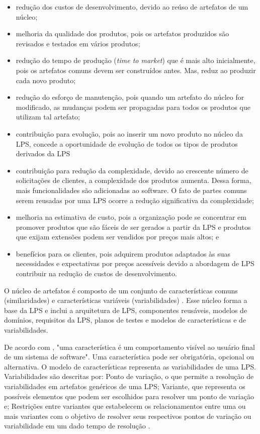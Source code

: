 \begin{itemize}
	\item redução dos custos de desenvolvimento, devido ao reúso de artefatos de um núcleo;
	\item melhoria da qualidade dos produtos, pois os artefatos produzidos são revisados e testados em vários produtos;
	\item redução do tempo de produção (\textit{time to market}) que é mais alto inicialmente, pois os artefatos comuns devem ser construídos antes. Mas, reduz ao produzir cada novo produto;
	\item redução do esforço de manutenção, pois quando um artefato do núcleo for modificado, as mudanças podem ser propagadas para todos os produtos que utilizam tal artefato;
	\item  contribuição para evolução, pois ao inserir um novo produto no núcleo da LPS, concede a oportunidade de evolução de todos os tipos de produtos derivados da LPS
	\item  contribuição para redução da complexidade, devido ao crescente número de solicitações de clientes, a complexidade dos produtos aumenta. Dessa forma, mais funcionalidades são adicionadas ao software. O fato de partes comuns serem 	reusadas por uma LPS ocorre a redução significativa da complexidade;
	\item melhoria na estimativa de custo, pois a organização pode se concentrar em promover produtos que são fáceis de ser gerados a partir da LPS e produtos que exijam extensões podem ser vendidos por preços mais altos; e 
	\item benefícios para os clientes, pois adquirem produtos adaptados às suas necessidades e expectativas por preços acessíveis devido a abordagem de LPS contribuir na redução de custos de desenvolvimento.
\end{itemize}

O núcleo de artefatos é composto de um conjunto de características comuns (similaridades) e características variáveis (variabilidades) \cite{linden2007product}. Esse núcleo forma a base da LPS e inclui a arquitetura de LPS, componentes reusáveis, modelos de domínios, requisitos da LPS, planos de testes e modelos de características e de variabilidades.

De acordo com \cite{apel2016feature}, "uma característica  é um comportamento visível ao usuário final de um sistema de software". Uma característica pode ser obrigatória, opcional ou alternativa. O modelo de características representa as variabilidades de uma LPS. Variabilidades são descritas por: Ponto de variação, o que permite a resolução de variabilidades em artefatos genéricos de uma LPS; Variante, que representa os possíveis elementos que podem ser escolhidos para resolver um ponto de variação e; Restrições entre variantes que estabelecem os relacionamentos entre uma ou mais variantes com o objetivo de resolver seus respectivos pontos de variação ou variabilidade em um dado tempo de resolução \cite{linden2007product,pohl2005software,apel2016feature}.

